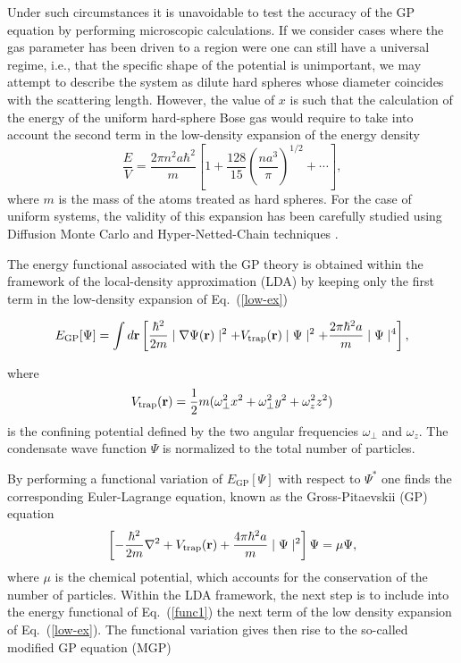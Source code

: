 \documentclass[10pt]{article}
\begin{document}
Under such circumstances it is unavoidable to test the accuracy of
the GP equation by performing microscopic calculations. If we consider cases
where the gas parameter has been driven to a region were one
can still have a universal regime, i.e., that the specific shape of
the potential is unimportant, we may attempt to describe the system as dilute
hard spheres whose diameter coincides with the scattering length.
However, the value of $x$ is such that the
calculation of the energy of the uniform hard-sphere Bose gas would
require to take into account the second term in the low-density
expansion \cite{fetter} of the energy density
\begin{equation}
  \frac {E}{V} = \frac {2 \pi n^2 a \hbar^2}{m}
  \left [ 1 + \frac {128}{15} \left ( \frac {n a^3}{\pi} \right)^{1/2}
          + \cdots \right ],
\label{low-ex}
\end{equation}
where $m$ is the mass of the atoms treated as hard spheres.
For the case of uniform systems, the validity of this expansion has been 
carefully studied using Diffusion Monte Carlo \cite{boro99} and
Hyper-Netted-Chain techniques \cite{mazz03}.

The energy functional associated with the GP theory is obtained
within the framework of  the local-density approximation (LDA) 
by keeping only the first
term in the low-density expansion of Eq.~(\ref{low-ex})

\begin{equation}
  E_{\mathrm{GP}} [\Psi] = \int d{\bf r} \left [ \frac {\hbar^2 }{2m} \mid \nabla
  \Psi({\bf r}) \mid^2 + V_{\mathrm{trap}}({\bf r})\mid \Psi \mid ^2+ \frac {2 \pi
  \hbar^2 a }{m}\mid \Psi \mid ^4 \right ],
\label{func1}
\end{equation}

where 
\begin{equation}
  V_{\mathrm{trap}}({\bf r}) = \frac {1}{2} m (\omega_{\bot}^2 x^2 
  + \omega_{\bot}^2 y^2 +\omega_{z}^2 z^2 ) 
\label{trap}
\end{equation}
is the confining potential defined by the two angular frequencies
$\omega_{\bot}$ and $\omega_{z}$.
The condensate 
wave function $\Psi$ is
normalized to the total number of particles. 

By performing a functional variation of $E_{\mathrm{GP}}[\Psi]$ with respect
to $\Psi^*$ one finds the corresponding Euler-Lagrange equation, 
known as the Gross-Pitaevskii (GP) equation
\begin{equation}
  \left [ - \frac {\hbar^2}{2m} \nabla^2 + V_{\mathrm{trap}}({\bf r}) + 
   \frac{4\pi\hbar^2 a}{m} \mid \Psi \mid^2 \right ]\Psi=\mu\Psi , 
\label{gp1} 
\end{equation}
where $\mu$ is the chemical potential, which accounts for the conservation
of the number of particles. Within the 
LDA framework, the next step 
is to include into the energy functional of Eq.~(\ref{func1})
the next term of the low density expansion of Eq.~(\ref{low-ex}). 
The functional variation gives then rise to the so-called 
modified GP equation (MGP) \cite{fabro99} 
\end{document}
